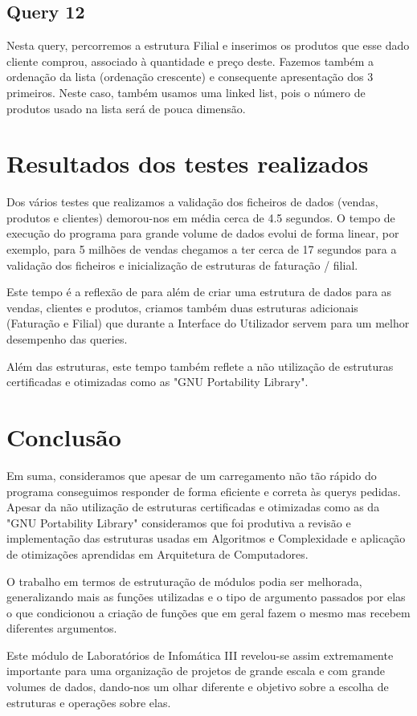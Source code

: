 \documentclass[a4paper,11pt]{report}
\begin{document}
\section*{Query 12}
Nesta query, percorremos a estrutura Filial e inserimos os produtos que esse dado cliente comprou, associado à quantidade e preço deste. Fazemos também a ordenação da lista (ordenação crescente) e consequente apresentação dos 3 primeiros. Neste caso, também usamos uma linked list, pois o número de produtos usado na lista será de pouca dimensão.



\chapter{Resultados dos testes realizados}
\quad Dos vários testes que realizamos a validação dos ficheiros de dados (vendas, produtos e clientes) demorou-nos em média cerca de 4.5 segundos. 
O tempo de execução do programa para grande volume de dados evolui de forma linear, por exemplo, para 5 milhões de vendas chegamos a ter cerca de 17 segundos para a validação dos ficheiros e inicialização de estruturas de faturação / filial.

Este tempo é a reflexão de para além de criar uma estrutura de dados para as vendas, clientes e produtos, criamos também duas estruturas adicionais (Faturação e Filial) que durante a Interface do Utilizador servem para um melhor desempenho das queries.

Além das estruturas, este tempo também reflete a não utilização de estruturas certificadas e otimizadas como as "GNU Portability Library".




\chapter{Conclusão}
\quad Em suma, consideramos que apesar de um carregamento não tão rápido do programa conseguimos responder de forma eficiente e correta às querys pedidas. Apesar da não utilização de estruturas certificadas e otimizadas como as da "GNU Portability Library" consideramos que foi produtiva a revisão e implementação das estruturas usadas em Algoritmos e Complexidade e aplicação de otimizações aprendidas em Arquitetura de Computadores.

O trabalho em termos de estruturação de módulos podia ser melhorada, generalizando mais as funções utilizadas e o tipo de argumento passados por elas o que condicionou a criação de funções que em geral fazem o mesmo mas recebem diferentes argumentos.

Este módulo de Laboratórios de Infomática III revelou-se assim extremamente importante para uma organização de projetos de grande escala e com grande volumes de dados, dando-nos um olhar diferente e objetivo sobre a escolha de estruturas e operações sobre elas.
\end{document}
